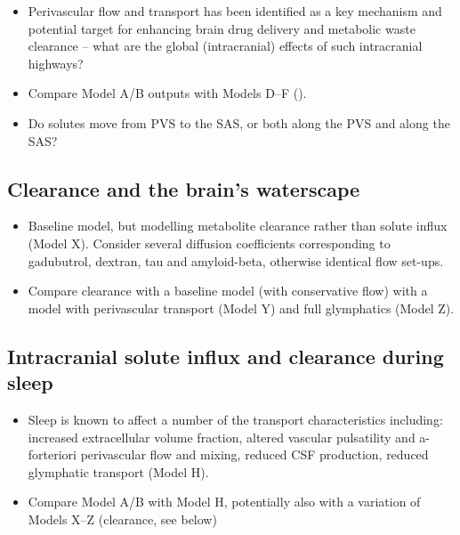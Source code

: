 \documentclass[fleqn,10pt]{wlscirep}
\newcommand{\draft}[1]{\textcolor{gray}{#1}}
\begin{document}
\begin{itemize}
\item
  Perivascular flow and transport has been identified as a key
  mechanism and potential target for enhancing brain drug delivery and
  metabolic waste clearance -- what are the global (intracranial)
  effects of such intracranial highways? 
\item
  Compare Model A/B outputs with Models D--F ().
\item
  Do solutes move from PVS to the SAS, or both along the PVS and along the SAS?
\end{itemize}

\draft{\lipsum[1]}


\subsection*{Clearance and the brain's waterscape}

\draft{\lipsum[1]}

\begin{itemize}
\item 
  Baseline model, but modelling metabolite clearance rather than solute
  influx (Model X). Consider several diffusion coefficients corresponding to
  gadubutrol, dextran, tau and amyloid-beta, otherwise identical flow
  set-ups. 
\item
  Compare clearance with a baseline model (with conservative flow)
  with a model with perivascular transport (Model Y) and full
  glymphatics (Model Z).
\end{itemize}

\subsection*{Intracranial solute influx and clearance during sleep}

\begin{itemize}
\item
  Sleep is known to affect a number of the transport characteristics including: increased extracellular volume fraction, altered vascular pulsatility and a-forteriori perivascular flow and mixing, reduced CSF production, reduced glymphatic transport (Model H).
\item
  Compare Model A/B with Model H, potentially also with a variation of Models X--Z (clearance, see below)
\end{itemize}

\draft{\lipsum[1]}
\end{document}
